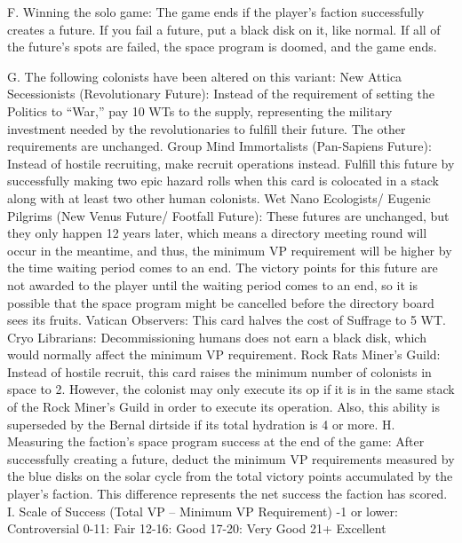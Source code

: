\documentclass[a4paper]{book}
\begin{document}
F. Winning the solo game: The game ends if the player’s faction successfully creates a future. If you fail a future, put a black disk on it, like normal. If all of the future’s spots are failed, the space program is doomed, and the game ends.
 
G. The following colonists have been altered on this variant:
New Attica Secessionists (Revolutionary Future): Instead of the requirement of setting the Politics to “War,” pay 10 WTs to the supply, representing the military investment needed by the revolutionaries to fulfill their future. The other requirements are unchanged.
Group Mind Immortalists (Pan-Sapiens Future): Instead of hostile recruiting, make recruit operations instead. Fulfill this future by successfully making two epic hazard rolls when this card is colocated in a stack along with at least two other human colonists.
Wet Nano Ecologists/ Eugenic Pilgrims (New Venus Future/ Footfall Future): These futures are unchanged, but they only happen 12 years later, which means a directory meeting round will occur in the meantime, and thus, the minimum VP requirement will be higher by the time waiting period comes to an end. The victory points for  this future are not awarded to the player until the waiting period comes to an end, so it is possible that the space program might be cancelled before the directory board sees its fruits.
Vatican Observers: This card halves the cost of Suffrage to 5 WT.
Cryo Librarians: Decommissioning humans does not earn a black disk, which would normally affect the minimum VP requirement.
Rock Rats Miner’s Guild: Instead of hostile recruit, this card raises the minimum number of colonists in space to 2. However, the colonist may only execute its op if it is in the same stack of the Rock Miner’s Guild in order to execute its operation. Also, this ability is superseded by the Bernal dirtside if its total hydration is 4 or more.
H. Measuring the faction’s space program success at the end of the game: After successfully creating a future, deduct the minimum VP requirements measured by the blue disks on the solar cycle from the total victory points accumulated by the player’s faction. This difference represents the net success the faction has scored.
I. Scale of Success (Total VP – Minimum VP Requirement)
-1 or lower: Controversial
0-11: Fair                 	
12-16: Good
17-20: Very Good
21+ Excellent
 
\end{document}
